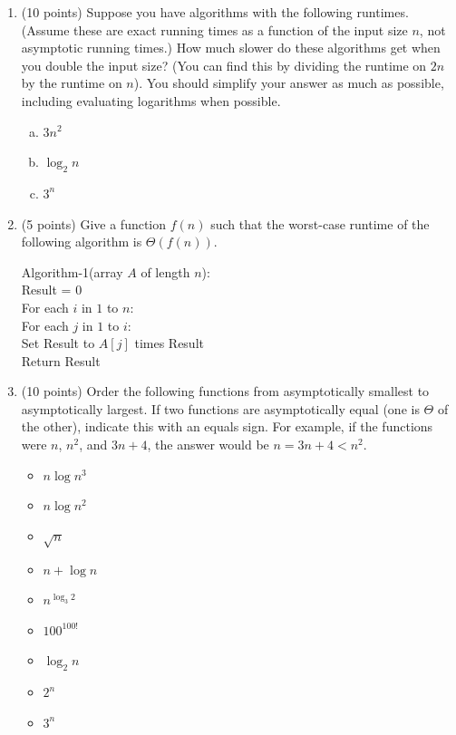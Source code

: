 \documentclass[11pt]{article}
\begin{document}
\begin{enumerate}
\subsection*{From Fall 2025 Exam 1}
\item (10 points)
Suppose you have algorithms with the following runtimes.
(Assume these are exact running times as a function of the input size $n$, not
asymptotic running times.) How much slower do these algorithms get when you
double the input size? (You can find this by dividing the runtime on $2n$ by the
runtime on $n$). You should simplify your answer as much as possible, including evaluating
logarithms when possible.

\begin{enumerate}[(a)]
    \item $3n^2$ 
\vspace{1in}
    \item $\log_2 n$
\vspace{1in}
    \item $3^{n}$
\vspace{1in}
\end{enumerate}


\item (5 points) Give a function $f(n)$ such that the worst-case runtime of the following algorithm is $\Theta(f(n))$. 

    \begin{algo}
    Algorithm-1(array $A$ of length $n$):\+\\
    Result = 0\\
    For each $i$ in $1$ to $n$:\+\\
    For each $j$ in $1$ to $i$:\+\\
    Set Result to $A[j]$ times Result\-\- \\
    Return Result\\
    \end{algo} 

    \vspace{3in}

\item (10 points) 
Order the following functions from asymptotically smallest to asymptotically largest. If two functions are asymptotically
    equal (one is $\Theta$ of the other), indicate this with an equals sign. For example, if the functions were $n$, $n^2$, and $3n + 4$, the answer would be
    $n = 3n + 4 < n^2$.

    \begin{itemize}
        \item $n \log n^3$
        \item $n \log n^2$
        \item $\sqrt{n}$
        \item $n + \log n$
        \item $n^{\log_3 2}$
        \item $100^{100!}$
        \item $\log_2 n$
        \item $2^n$
        \item $3^n$
    \end{itemize}


\end{enumerate}
\end{document}
